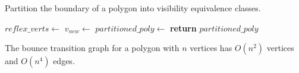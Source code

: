 \documentclass[]{styles/svproc}  %
\begin{document}
\begin{algorithm}
\caption{Partition the boundary of a polygon into visibility
equivalence classes.}
\label{algo:insert}
\begin{algorithmic}
\State $reflex\_verts \gets$ 
     
        \State $v_{new} \gets$ 
    \EndFor
\EndFor
\State $partitioned\_poly \gets$ 
\State \textbf{return} $partitioned\_poly$
\EndProcedure
\end{algorithmic}
\end{algorithm}

\begin{proposition} The bounce transition graph for a polygon with $n$ vertices has 
$O(n^2)$ vertices and $O(n^4)$ edges.
\end{proposition}
\end{document}
